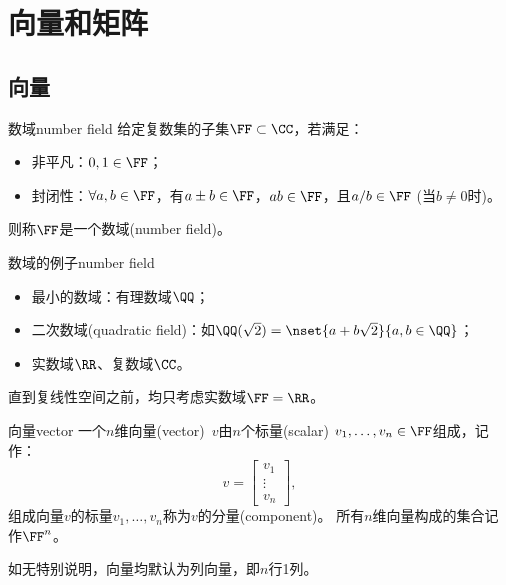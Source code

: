 \chapter{向量和矩阵}

\section{向量}

\begin{definition}
	{数域}{number field}
	给定复数集的子集$\FF\subset\CC$，若满足：
	\begin{itemize}
		\item 非平凡：$0,1\in\FF$；
		\item 封闭性：$\forall a,b\in\FF$，有$a\pm b\in\FF$，$ab\in\FF$，且$a/b\in\FF$ (当$b\neq 0$时)。
	\end{itemize}
	则称$\FF$是一个数域(number field)。
\end{definition}

\begin{example}
	{数域的例子}{number field}
	\begin{itemize}
		\item 最小的数域：有理数域$\QQ$；
	
		\item 二次数域(quadratic field)：如$\QQ(\sqrt 2)=\nset{a+b\sqrt2}{a,b\in\QQ}$；
	
		\item 实数域$\RR$、复数域$\CC$。
	\end{itemize}
\end{example}

\begin{remark}
	直到复线性空间之前，均只考虑实数域$\FF=\RR$。
\end{remark}

\begin{definition}{向量}{vector}
	一个$n$维向量(vector)~$v$由$n$个标量(scalar) $v_1,\ldots,v_n\in\FF$组成，记作：
	\[
		v=\begin{bmatrix}
			v_1\\\vdots\\v_n
		\end{bmatrix},
	\]
	组成向量$v$的标量$v_1,\ldots,v_n$称为$v$的分量(component)。
	\tcblower
	所有$n$维向量构成的集合记作$\FF^n$。
\end{definition}

\begin{remark}
	如无特别说明，向量均默认为列向量，即$n$行1列。
\end{remark}

